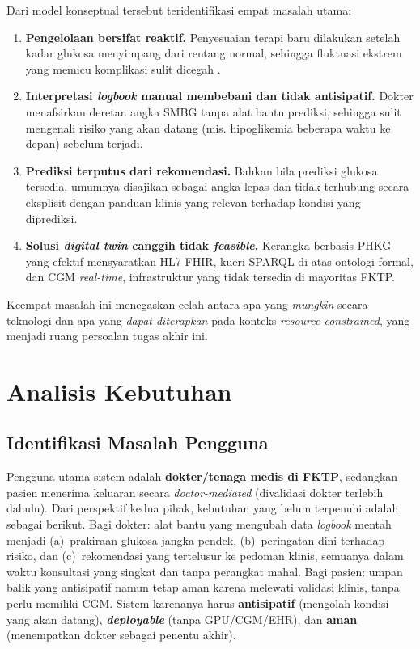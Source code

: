 Dari model konseptual tersebut teridentifikasi empat masalah utama:
\begin{enumerate}
    \item \textbf{Pengelolaan bersifat reaktif.} Penyesuaian terapi baru dilakukan setelah kadar glukosa menyimpang dari rentang normal, sehingga fluktuasi ekstrem yang memicu komplikasi sulit dicegah \autocite{alkaff2021}.
    \item \textbf{Interpretasi \emph{logbook} manual membebani dan tidak antisipatif.} Dokter menafsirkan deretan angka SMBG tanpa alat bantu prediksi, sehingga sulit mengenali risiko yang akan datang (mis. hipoglikemia beberapa waktu ke depan) sebelum terjadi.
    \item \textbf{Prediksi terputus dari rekomendasi.} Bahkan bila prediksi glukosa tersedia, umumnya disajikan sebagai angka lepas dan tidak terhubung secara eksplisit dengan panduan klinis yang relevan terhadap kondisi yang diprediksi.
    \item \textbf{Solusi \emph{digital twin} canggih tidak \emph{feasible}.} Kerangka berbasis PHKG yang efektif \autocite{rad2024} mensyaratkan HL7 FHIR, kueri SPARQL di atas ontologi formal, dan CGM \emph{real-time}, infrastruktur yang tidak tersedia di mayoritas FKTP.
\end{enumerate}

Keempat masalah ini menegaskan celah antara apa yang \emph{mungkin} secara teknologi dan apa yang \emph{dapat diterapkan} pada konteks \emph{resource-constrained}, yang menjadi ruang persoalan tugas akhir ini.

\section{Analisis Kebutuhan}
\label{sec:kebutuhan-sistem}

\subsection{Identifikasi Masalah Pengguna}
Pengguna utama sistem adalah \textbf{dokter/tenaga medis di FKTP}, sedangkan pasien menerima keluaran secara \emph{doctor-mediated} (divalidasi dokter terlebih dahulu). Dari perspektif kedua pihak, kebutuhan yang belum terpenuhi adalah sebagai berikut. Bagi dokter: alat bantu yang mengubah data \emph{logbook} mentah menjadi (a)~prakiraan glukosa jangka pendek, (b)~peringatan dini terhadap risiko, dan (c)~rekomendasi yang tertelusur ke pedoman klinis, semuanya dalam waktu konsultasi yang singkat dan tanpa perangkat mahal. Bagi pasien: umpan balik yang antisipatif namun tetap aman karena melewati validasi klinis, tanpa perlu memiliki CGM. Sistem karenanya harus \textbf{antisipatif} (mengolah kondisi yang akan datang), \textbf{\emph{deployable}} (tanpa GPU/CGM/EHR), dan \textbf{aman} (menempatkan dokter sebagai penentu akhir).

